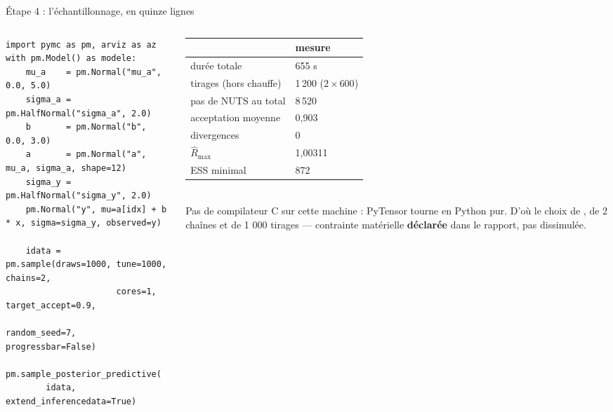 \begin{frame}[fragile]{Étape 4 : l'échantillonnage, en quinze lignes}
\begin{columns}[t]
\begin{column}{0.55\textwidth}
\begin{codebox}
\begin{lstlisting}[basicstyle=\ttfamily\fontsize{5.8}{6.6}\selectfont]
import pymc as pm, arviz as az
with pm.Model() as modele:
    mu_a    = pm.Normal("mu_a", 0.0, 5.0)
    sigma_a = pm.HalfNormal("sigma_a", 2.0)
    b       = pm.Normal("b", 0.0, 3.0)
    a       = pm.Normal("a", mu_a, sigma_a, shape=12)
    sigma_y = pm.HalfNormal("sigma_y", 2.0)
    pm.Normal("y", mu=a[idx] + b * x, sigma=sigma_y, observed=y)

    idata = pm.sample(draws=1000, tune=1000, chains=2,
                      cores=1, target_accept=0.9,
                      random_seed=7, progressbar=False)
    pm.sample_posterior_predictive(
        idata, extend_inferencedata=True)
\end{lstlisting}
\end{codebox}
\end{column}
\begin{column}{0.43\textwidth}
\begin{solbox}
\footnotesize\begin{tabular}{@{}p{3.4cm}p{1.9cm}@{}}
\toprule
& mesure \\
\midrule
durée totale & 655 s \\
tirages (hors chauffe) & 1 200 ($2 \times 600$) \\
pas de NUTS au total & 8 520 \\
acceptation moyenne & 0,903 \\
divergences & 0 \\
$\hat R_{\max}$ & 1,00311 \\
ESS minimal & 872 \\
\bottomrule
\end{tabular}
\vspace{1.5mm}
\\ Pas de compilateur C sur cette machine : PyTensor tourne en Python pur. D'où
le choix de , de 2 chaînes et de 1 000 tirages --- contrainte
matérielle \textbf{déclarée} dans le rapport, pas dissimulée.
\end{solbox}
\end{column}
\end{columns}
\end{frame}


